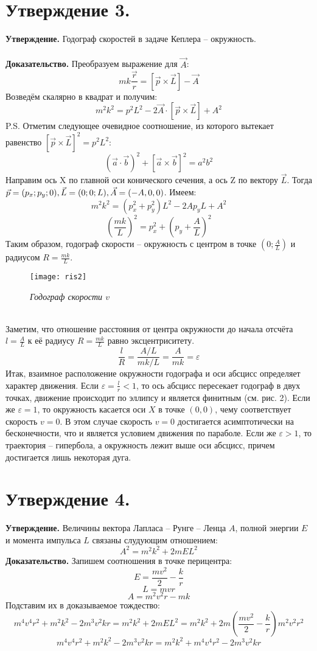 \documentclass[a4paper,12pt]{article}
\begin{document}
\section*{Утверждение 3.}
\textbf{Утверждение.} Годограф скоростей в задаче Кеплера -- окружность.
\\\\
\textbf{Доказательство.}
Преобразуем выражение для $\vec{A}$:
\[mk\frac{\vec{r}}{r} = \left[\vec{p} \times \vec{L}\right] - \vec{A} \]
Возведём скалярно в квадрат и получим:
\[m^2k^2 = p^2L^2 - 2\vec{A}\cdot\left[\vec{p}\times\vec{L} \right] + A^2\]
P.S. Отметим следующее очевидное соотношение, из которого вытекает равенство $\left[\vec{p}\times\vec{L} \right]^2 = p^2L^2$:
\[(\vec{a}\cdot\vec{b})^2 + \left[\vec{a}\times\vec{b} \right]^2 = a^2b^2 \]
Направим ось X по главной оси конического сечения, а ось Z по вектору $\vec{L}$. Тогда $\vec{p} = (p_x; p_y; 0),
\\
\vec{L} = (0; 0; L), \vec{A} = (-A, 0, 0)$. Имеем:
\[m^2k^2 = (p_x^2 + p_y^2)L^2 - 2Ap_yL + A^2 \]
\[(\frac{mk}{L})^2 = p_x^2 + (p_y + \frac{A}{L})^2 \]
Таким образом, годограф скорости -- окружность с центром в точке $(0; \frac{A}{L})$ и радиусом $R = \frac{mk}{L}$.
\\
\begin{figure}[h]
    \centering
    \texttt{[image: ris2]}
    \caption{\textit{Годограф скорости $v$}}
\end{figure}
\\
Заметим, что отношение расстояния от центра окружности до начала отсчёта $l = \frac{A}{L}$ к её радиусу $R = \frac{mk}{L}$ равно эксцентриситету.
\[\frac{l}{R} = \frac{A/L}{mk/L} = \frac{A}{mk} = \varepsilon\]
Итак, взаимное расположение окружности годографа и оси абсцисс определяет характер движения. Если $\varepsilon = \frac{l}{r} < 1$, то ось абсцисс пересекает годограф в двух точках, движение происходит по эллипсу и является финитным (см. рис. 2). Если же $\varepsilon = 1$, то окружность касается оси $X$ в точке $(0, 0)$, чему соответствует скорость $v = 0$. В этом случае скорость $v = 0$ достигается асимптотически на бесконечности, что и является условием движения по параболе. Если же $\varepsilon > 1$, то траектория -- гипербола, а окружность лежит выше оси абсцисс, причем достигается лишь некоторая дуга.

\section*{Утверждение 4.}
\textbf{Утверждение.} Величины вектора Лапласа -- Рунге -- Ленца $A$, полной энергии $E$ и момента импульса $L$ связаны слудующим отношением:
\[A^2 = m^2k^2 + 2mEL^2\]
\textbf{Доказательство.} Запишем соотношения в точке перицентра:
\[E = \frac{mv^2}{2} - \frac{k}{r}\]
\[L = mvr\]
\[A = m^2v^2r - mk\]
Подставим их в доказываемое тождество:
\[m^4v^4r^2 + m^2k^2 - 2m^3v^2kr = m^2k^2 + 2mEL^2 = m^2k^2 + 2m \left(\frac{mv^2}{2} - \frac{k}{r}\right)m^2v^2r^2\]
\[m^4v^4r^2 + m^2k^2 - 2m^3v^2kr = m^2k^2 + m^4v^4r^2 - 2m^3v^2kr\]
\end{document}
